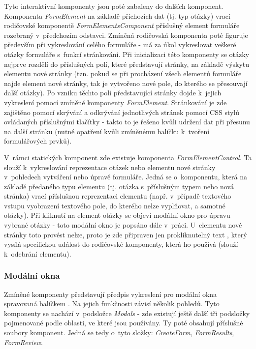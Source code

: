 		Tyto interaktivní komponenty jsou poté zabaleny do dalších komponent. Komponenta \textit{FormElement} na základě příchozích dat (tj. typ otázky) vrací rodičovské komponentě \textit{FormElementsComponent} příslušný element formuláře rozebraný v~předchozím odstavci. Zmíněná rodičovská komponenta poté figuruje především při vykreslování celého formuláře - má za úkol vykreslovat veškeré otázky formuláře s~funkcí stránkování. Při inicializaci této komponenty se otázky nejprve rozdělí do příslušných polí, které představují stránky, na základě výskytu elementu nové stránky (tzn. pokud se při procházení všech elementů formuláře najde element nové stránky, tak je vytvořeno nové pole, do kterého se přesouvají další otázky). Po vzniku těchto polí představující stránky dojde k~jejich vykreslení pomocí zmíněné komponenty \textit{FormElement}. Stránkování je zde zajištěno pomocí skrývání a odkrývání jednotlivých stránek pomocí CSS stylů ovládaných příslušnými tlačítky - takto to je řešeno kvůli udržení dat při přesunu na další stránku (nutné opatření kvůli zmíněnému balíčku k~tvoření formulářových prvků).
		
		V~rámci statických komponent zde existuje komponenta \textit{FormElementControl}. Ta slouží k~vykreslování reprezentace otázek nebo elementu nové stránky v~pohledech vytváření nebo úpravě formuláře. Jedná se o~komponentu, která na základě předaného typu elementu (tj. otázka s~příslušným typem nebo nová stránka) vrací příslušnou reprezentaci elementu (např. v~případě textového vstupu vyobrazení textového pole, do kterého nelze vyplňovat, a samotné otázky). Při kliknutí na element otázky se objeví modální okno pro úpravu vybrané otázky - toto modální okno je popsáno dále v~práci. U~elementu nové stránky toto provést nelze, proto je zde připraven jen prokliknutelný text , který vysílá specifickou událost do rodičovské komponenty, která ho používá (slouží k~odebrání elementu).
	
		\subsubsection{Modální okna} \label{sec:komp_modal} %
		Zmíněné komponenty představují předpis vykreslení pro modální okna spravovaná balíčkem . Na jejich funkčnosti závisí několik pohledů. Tyto komponenty se nachází v~podsložce \textit{Modals} - zde existují ještě další tři podsložky pojmenované podle oblasti, ve které jsou používány. Ty poté obsahují příslušné soubory komponent. Jedná se tedy o~tyto složky: \textit{CreateForm}, \textit{FormResults}, \textit{FormReview}. 
		
